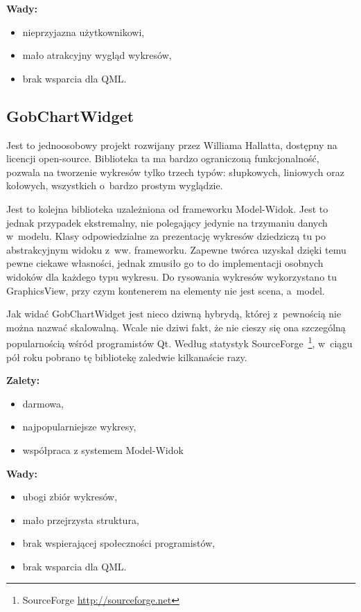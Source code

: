 \textbf{Wady:}
\begin{itemize}
\item{nieprzyjazna użytkownikowi,}
\item{mało atrakcyjny wygląd wykresów,}
\item{brak wsparcia dla QML.}
\end{itemize}

\subsection{GobChartWidget}
Jest to jednoosobowy projekt rozwijany przez Williama Hallatta, dostępny na licencji open-source. Biblioteka ta ma bardzo ograniczoną funkcjonalność, pozwala na tworzenie wykresów tylko trzech typów: słupkowych, liniowych oraz kołowych, wszystkich o~bardzo prostym wyglądzie.\newline

Jest to kolejna biblioteka uzależniona od frameworku Model-Widok. Jest to jednak przypadek ekstremalny, nie polegający jedynie na trzymaniu danych w~modelu. Klasy odpowiedzialne za prezentację wykresów dziedziczą tu po abstrakcyjnym widoku z~ww. frameworku. Zapewne twórca uzyskał dzięki temu pewne ciekawe własności, jednak zmusiło go to do implementacji osobnych widoków dla każdego typu wykresu.
Do rysowania wykresów wykorzystano tu GraphicsView, przy czym kontenerem na elementy nie jest scena, a~model.\newline

Jak widać GobChartWidget jest nieco dziwną hybrydą, której z~pewnością nie można nazwać skalowalną. Wcale nie dziwi fakt, że nie cieszy się ona szczególną popularnością wśród programistów Qt. Według statystyk SourceForge~\footnote{SourceForge \url{http://sourceforge.net}}, w~ciągu pół roku pobrano tę bibliotekę zaledwie kilkanaście razy.

\textbf{Zalety:}
\begin{itemize}
\item{darmowa,}
\item{najpopularniejsze wykresy,}
\item{współpraca z systemem Model-Widok}\newline
\end{itemize}

\textbf{Wady:}
\begin{itemize}
\item{ubogi zbiór wykresów,}
\item{mało przejrzysta struktura,}
\item{brak wspierającej społeczności programistów,}
\item{brak wsparcia dla QML.}
\end{itemize}



